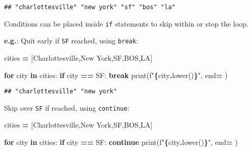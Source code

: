 \documentclass[
]{book}
\newenvironment{Shaded}{\begin{snugshade}}{\end{snugshade}}
\newcommand{\BuiltInTok}[1]{#1}
\newcommand{\ControlFlowTok}[1]{\textcolor[rgb]{0.13,0.29,0.53}{\textbf{#1}}}
\newcommand{\KeywordTok}[1]{\textcolor[rgb]{0.13,0.29,0.53}{\textbf{#1}}}
\newcommand{\NormalTok}[1]{#1}
\newcommand{\OperatorTok}[1]{\textcolor[rgb]{0.81,0.36,0.00}{\textbf{#1}}}
\newcommand{\SpecialCharTok}[1]{\textcolor[rgb]{0.81,0.36,0.00}{\textbf{#1}}}
\newcommand{\SpecialStringTok}[1]{\textcolor[rgb]{0.31,0.60,0.02}{#1}}
\newcommand{\StringTok}[1]{\textcolor[rgb]{0.31,0.60,0.02}{#1}}
\begin{document}
\begin{verbatim}
## "charlottesville" "new york" "sf" "bos" "la"
\end{verbatim}

Conditions can be placed inside \texttt{if} statements to skip within or stop the loop.

\textbf{e.g.}: Quit early if \texttt{SF} reached, using \texttt{break}:

\begin{Shaded}
\begin{Highlighting}[]
\NormalTok{cities }\OperatorTok{=}\NormalTok{ [}\StringTok{\textquotesingle{}Charlottesville\textquotesingle{}}\NormalTok{,}\StringTok{\textquotesingle{}New York\textquotesingle{}}\NormalTok{,}\StringTok{\textquotesingle{}SF\textquotesingle{}}\NormalTok{,}\StringTok{\textquotesingle{}BOS\textquotesingle{}}\NormalTok{,}\StringTok{\textquotesingle{}LA\textquotesingle{}}\NormalTok{]}

\ControlFlowTok{for}\NormalTok{ city }\KeywordTok{in}\NormalTok{ cities:  }
    \ControlFlowTok{if}\NormalTok{ city }\OperatorTok{==} \StringTok{\textquotesingle{}SF\textquotesingle{}}\NormalTok{:}
        \ControlFlowTok{break}
    \BuiltInTok{print}\NormalTok{(}\SpecialStringTok{f\textquotesingle{}"}\SpecialCharTok{\{}\NormalTok{city}\SpecialCharTok{.}\NormalTok{lower()}\SpecialCharTok{\}}\SpecialStringTok{"\textquotesingle{}}\NormalTok{, end}\OperatorTok{=}\StringTok{\textquotesingle{} \textquotesingle{}}\NormalTok{)}
\end{Highlighting}
\end{Shaded}

\begin{verbatim}
## "charlottesville" "new york"
\end{verbatim}

Skip over \texttt{SF} if reached, using \texttt{continue}:

\begin{Shaded}
\begin{Highlighting}[]
\NormalTok{cities }\OperatorTok{=}\NormalTok{ [}\StringTok{\textquotesingle{}Charlottesville\textquotesingle{}}\NormalTok{,}\StringTok{\textquotesingle{}New York\textquotesingle{}}\NormalTok{,}\StringTok{\textquotesingle{}SF\textquotesingle{}}\NormalTok{,}\StringTok{\textquotesingle{}BOS\textquotesingle{}}\NormalTok{,}\StringTok{\textquotesingle{}LA\textquotesingle{}}\NormalTok{]}

\ControlFlowTok{for}\NormalTok{ city }\KeywordTok{in}\NormalTok{ cities:}
    \ControlFlowTok{if}\NormalTok{ city }\OperatorTok{==} \StringTok{\textquotesingle{}SF\textquotesingle{}}\NormalTok{:}
        \ControlFlowTok{continue}
    \BuiltInTok{print}\NormalTok{(}\SpecialStringTok{f\textquotesingle{}"}\SpecialCharTok{\{}\NormalTok{city}\SpecialCharTok{.}\NormalTok{lower()}\SpecialCharTok{\}}\SpecialStringTok{"\textquotesingle{}}\NormalTok{, end}\OperatorTok{=}\StringTok{\textquotesingle{} \textquotesingle{}}\NormalTok{)        }
\end{Highlighting}
\end{Shaded}
\end{document}
